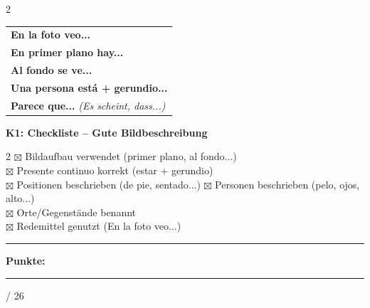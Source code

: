 \documentclass[10pt, a4paper]{article}
\newcommand{\sanstext}[1]{{\fontfamily{phv}\selectfont #1}}
\newcommand{\maxpunkte}{26}
\newcommand{\es}[1]{\textbf{#1}}
\newcommand{\de}[1]{{\small\textit{\textcolor{mittelgrau}{#1}}}}
\newcommand{\luecke}[1]{\rule{#1}{0.4pt}}
\begin{document}
\begin{multicols}{2}
\vspace{6pt}

\begin{vokabelbox}[Redemittel]
{\small
\begin{tabular}{@{}l@{}}
\es{En la foto veo...} \\
\es{En primer plano hay...} \\
\es{Al fondo se ve...} \\
\es{Una persona está + gerundio...} \\
\es{Parece que...} \de{(Es scheint, dass...)} \\
\end{tabular}
}
\end{vokabelbox}

\end{multicols}


\vspace{4pt}

\begin{checklistbox}
\sanstext{\small\textbf{K1: Checkliste – Gute Bildbeschreibung}}

\vspace{4pt}

{\small
\begin{multicols}{2}
$\boxtimes$ Bildaufbau verwendet (primer plano, al fondo...)\\
$\boxtimes$ Presente continuo korrekt (estar + gerundio)\\
$\boxtimes$ Positionen beschrieben (de pie, sentado...)
\columnbreak
$\boxtimes$ Personen beschrieben (pelo, ojos, alto...)\\
$\boxtimes$ Orte/Gegenstände benannt\\
$\boxtimes$ Redemittel genutzt (En la foto veo...)
\end{multicols}
}
\end{checklistbox}


\vfill

\noindent\rule{\textwidth}{0.5pt}

\vspace{4pt}

\hfill\sanstext{\textbf{Punkte:}} \luecke{1.2cm} / \maxpunkte
\end{document}
